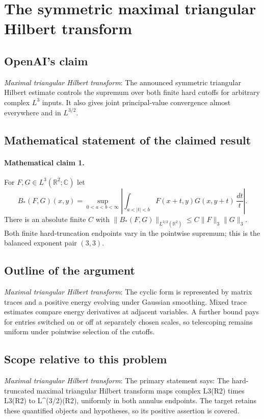 \documentclass[11pt]{article}
\begin{document}
\section*{The symmetric maximal triangular Hilbert transform}

\subsection{OpenAI's claim}
\textit{Maximal triangular Hilbert transform}: The announced symmetric triangular Hilbert estimate controls the supremum over both finite hard cutoffs for arbitrary complex $L^3$ inputs. It also gives joint principal-value convergence almost everywhere and in $L^{3/2}$.

\subsection{Mathematical statement of the claimed result}
\paragraph{Mathematical claim 1.} For $F,G\in L^3(\mathbb R^2;\mathbb C)$ let \[B_*(F,G)(x,y)=\sup_{0<a<b<\infty}\left|\int_{a<|t|<b}F(x+t,y)G(x,y+t)\,\frac{dt}{t}\right|.\] There is an absolute finite $C$ with $\|B_*(F,G)\|_{L^{3/2}(\mathbb R^2)}\le C\|F\|_3\|G\|_3$. Both finite hard-truncation endpoints vary in the pointwise supremum; this is the balanced exponent pair $(3,3)$.

\subsection{Outline of the argument}
\textit{Maximal triangular Hilbert transform}: The cyclic form is represented by matrix traces and a positive energy evolving under Gaussian smoothing. Mixed trace estimates compare energy derivatives at adjacent variables. A further bound pays for entries switched on or off at separately chosen scales, so telescoping remains uniform under pointwise selection of the cutoffs.

\subsection{Scope relative to this problem}
\textit{Maximal triangular Hilbert transform}: The primary statement says: The hard-truncated maximal triangular Hilbert transform maps complex L3(R2) times L3(R2) to L\textasciicircum{}(3/2)(R2), uniformly in both annulus endpoints. The target retains these quantified objects and hypotheses, so its positive assertion is covered.
\end{document}
